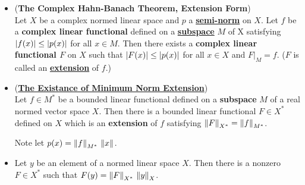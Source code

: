 \documentclass[11pt]{article}
\begin{document}
\begin{itemize}
\begin{proof}
Let $\{F_\alpha \}_{\alpha \in A}$ be a \emph{\textbf{linearly ordered subset}} of $\cF$; let $X_{\alpha}$ be the subspace on which $F_{\alpha}$ is defined. Define $F$
on $\bigcup_{\alpha \in A}X_{\alpha}$ by setting $F(x) = F_{\alpha}(x)$ if $x \in X_{\alpha}$. Clearly $F_{\alpha} \preceq F$ so \emph{\textbf{each linearly ordered subset of $\cF$ has an upper bound}}. By \emph{\textbf{Zorn's lemma}}, $\cF$ has a \emph{\textbf{maximal element}} $\Lambda$, defined on some set $X'$, satisfying $\Lambda(x)\le p(x)$ for $x \in X'$. But, \emph{$X'$ must be all of $X$}, since \emph{otherwise} we could extend $\Lambda$ to a $\widetilde{\Lambda}$ on a \emph{larger} space by adding one dimension as above. Since this \emph{\textbf{contradicts}} \emph{the \textbf{maximality} of $\Lambda$}, we must have $X = X'$. Thus, the extension $\Lambda$ is \emph{everywhere defined}. \qed
\end{proof}



\item \begin{theorem} (\textbf{The Complex Hahn-Banach Theorem, Extension Form}) \citep{kreyszig1989introductory, reed1980methods, luenberger1997optimization, folland2013real}\\
Let $X$ be a complex normed linear space and $p$ a \underline{\textbf{semi-norm}} on $X$. Let $f$ be a \textbf{complex linear functional} defined on a \underline{\textbf{subspace}} $M$ of X satisfying $\left\lvert f(x) \right\rvert \le \left\lvert p(x) \right\rvert$ for all $x \in M$. Then there exists a \textbf{complex linear functional $F$} on $X$ such that $\left\lvert F(x) \right\rvert \le \left\lvert p(x) \right\rvert$  for all $x \in X$ and $F|_{M} = f$. ($F$ is called an \underline{\textbf{extension}} of $f$.) 
\end{theorem}

\item \begin{corollary} (\underline{\textbf{The Existance of Minimum Norm Extension}})\\
Let $f \in M^{*}$ be a bounded linear functional defined on a \textbf{subspace} $M$ of a real normed vector space $X$. Then there is a bounded linear functional
$F \in X^{*}$ defined on $X$ which is an \textbf{extension} of $f$ satisfying $\left\|F\right\|_{X^{*}} = \left\|f\right\|_{M^{*}}$.
\end{corollary} 
Note let $p(x) = \left\|f\right\|_{M^{*}}\,\left\|x\right\|_{}$.

\item \begin{corollary}
Let $y$ be an element of a normed linear space $X$. Then there is a nonzero $F \in X^{*}$ such that $F(y) = \left\|F\right\|_{X^{*}}\,\left\|y\right\|_{X}$.
\end{corollary}


\end{itemize}
\end{document}
